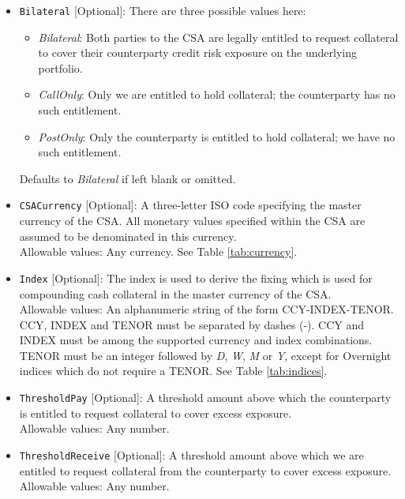 \begin{itemize}
  \item \lstinline!Bilateral! [Optional]: There are three possible values here:
  \begin{itemize}
    \item \emph{Bilateral}: Both parties to the CSA are legally entitled to
      request collateral to cover their counterparty credit risk exposure
      on the underlying portfolio.
    \item \emph{CallOnly}: Only we are entitled to hold collateral; the
      counterparty has no such entitlement.
    \item \emph{PostOnly}: Only the counterparty is entitled to hold collateral;
      we have no such entitlement.
  \end{itemize}
  Defaults to \emph{Bilateral} if left blank or omitted.
  
  \item \lstinline!CSACurrency! [Optional]: A three-letter ISO code specifying the master
  currency of the CSA. All monetary values specified within the CSA are
  assumed to be denominated in this currency.\\
  Allowable values: Any currency. See Table \ref{tab:currency}.

  \item \lstinline!Index! [Optional]: The index is used to derive the fixing which is used
  for compounding cash collateral in the master currency of the CSA.\\
  Allowable values: An alphanumeric string of the form CCY-INDEX-TENOR. CCY, INDEX and TENOR must be separated by dashes (-). CCY and INDEX must be among the supported currency and index combinations. TENOR must be an integer followed by \emph{D}, \emph{W}, \emph{M} or \emph{Y}, except for Overnight indices which do not require a TENOR. See Table \ref{tab:indices}.

  \item \lstinline!ThresholdPay! [Optional]: A threshold amount above which the
  counterparty is entitled to request collateral to cover excess
  exposure.\\
  Allowable values: Any number.

  \item \lstinline!ThresholdReceive! [Optional]: A threshold amount above which we are
  entitled to request collateral from the counterparty to cover excess
  exposure.\\
  Allowable values: Any number.


\end{itemize}
